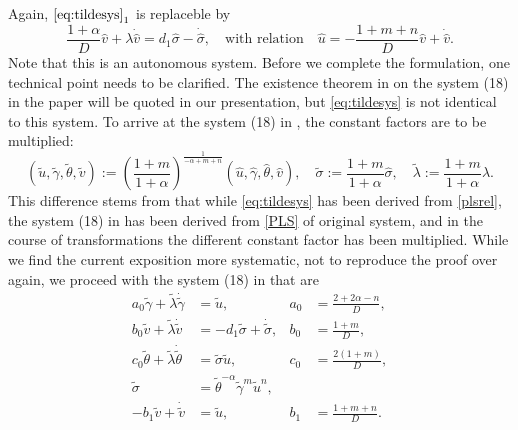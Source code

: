 \documentclass[a4paper,11pt]{article}
\def\tg{{\tilde{\gamma}}}
\def\tv{{\tilde{v}}}
\def\tth{{\tilde{\theta}}}
\def\ts{{\tilde{\sigma}}}
\def\tu{{\tilde{u}}}
\def\hg{{\hat{\gamma}}}
\def\hv{{\hat{v}}}
\def\hth{{\hat{\theta}}}
\def\hs{{\hat{\sigma}}}
\def\hu{{\hat{u}}}
\def\dtg{{\dot{\tilde{\gamma}}}}
\def\dtv{{\dot{\tilde{v}}}}
\def\dtth{{\dot{\tilde{\theta}}}}
\def\dts{{\dot{\tilde{\sigma}}}}
\theoremstyle{remark}
\begin{document}
Again, $\eqref{eq:tildesys}_1$ is replaceble by
$$\frac{1+ \alpha}{D} \hv + \lambda \dot\hv = d_1 \hs -\dot\hs, \quad \text{with relation} \quad \hu = -\frac{1+m+n}{D}\hv + \dot\hv.$$
Note that this is an autonomous system. Before we complete the formulation, one technical point needs to be clarified. The existence theorem in \cite{LKT17} on the system (18) in the paper will be quoted in our presentation, but \eqref{eq:tildesys} is not identical to this system. To arrive at the system (18) in \cite{LKT17}, the constant factors are to be multiplied: 
$$(\tu,\tg,\tth,\tv):=\left(\frac{1+m}{1+\alpha}\right)^{\frac{1}{-\alpha+m+n}}(\hu,\hg,\hth,\hv), \quad \ts:=\frac{1+m}{1+\alpha}\hs, \quad \tilde\lambda :=\frac{1+m}{1+\alpha}\lambda.$$
This difference stems from that while \eqref{eq:tildesys} has been derived from \eqref{plsrel}, the system (18) in \cite{LKT17} has been derived from \eqref{PLS} of original system, and in the course of transformations the different constant factor has been multiplied. While we find the current exposition more systematic, not to reproduce the proof over again, we proceed with the system (18) in \cite{LKT17} that are
\begin{equation} \label{eq:tildesys2}
 \begin{aligned}
  a_0\tg + \tilde\lambda\dtg &=\tu, & a_0&=\frac{2+2\alpha-n}{D},\\
  b_0\tv + \tilde\lambda\dtv &=-d_1 \ts + \dts,& b_0&=\frac{1+m}{D},\\
  c_0\tth+ \tilde\lambda\dtth&=\ts\tu, & c_0&=\frac{2(1+m)}{D},\\
  \ts &=\tth^{-\alpha}\tg^m\tu^n, \\
  -b_1\tv+\dtv &= \tu, & b_1&=\frac{1+m+n}{D}.
 \end{aligned}
\end{equation}
% 
% 
% 
\end{document}

